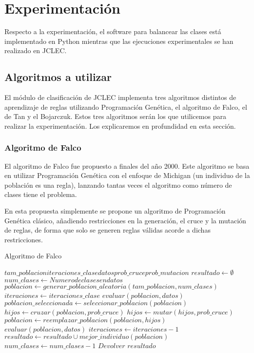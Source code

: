 \section{Experimentación}

Respecto a la experimentación, el software para balancear las clases está implementado en Python mientras que las ejecuciones experimentales se han realizado en JCLEC.


\subsection{Algoritmos a utilizar}

El módulo de clasificación de JCLEC implementa tres algoritmos distintos de aprendizaje de reglas utilizando Programación Genética, el algoritmo de Falco, el de Tan y el Bojarczuk. Estos tres algoritmos serán los que utilicemos para realizar la experimentación. Los explicaremos en profundidad en esta sección.

\subsubsection{Algoritmo de Falco}

El algoritmo de Falco \cite{algoritmoFalco} fue propuesto a finales del año 2000. Este algoritmo se basa en utilizar Programación Genética con el enfoque de Michigan (un individuo de la población es una regla), lanzando tantas veces el algoritmo como número de clases tiene el problema.

En esta propuesta simplemente se propone un algoritmo de Programación Genética clásico, añadiendo restricciones en la generación, el cruce y la mutación de reglas, de forma que solo se generen reglas válidas acorde a dichas restricciones.

\begin{algorithm}
\caption{Algoritmo de Falco}\label{alg:falco}
\begin{algorithmic}
	\Require $tam\_poblacion iteraciones\_clase datos prob\_cruce prob\_mutacion$
	\State $resultado \gets \emptyset$
	\State $num\_clases \gets Numero de clases en datos$
		\State $poblacion \gets generar\_poblacion\_aleatoria(tam\_poblacion, num\_clases)$ 
		\State $iteraciones \gets iteraciones\_clase$
		\State $evaluar(poblacion, datos)$
			\State $poblacion\_seleccionada \gets seleccionar\_poblacion(poblacion)$
			\State $hijos \gets cruzar(poblacion, prob\_cruce)$
			\State $hijos \gets mutar(hijos, prob\_cruce)$
			\State $poblacion \gets reemplazar\_poblacion(poblacion, hijos)$ 
			\State $evaluar(poblacion, datos)$
			\State $iteraciones \gets iteraciones - 1$
		\EndWhile
		\State $resultado \gets resultado \cup mejor\_individuo(poblacion)$
		\State $num\_clases \gets num\_clases - 1$
	\EndWhile
	\State $Devolver$ $resultado$
\end{algorithmic}
\end{algorithm}



